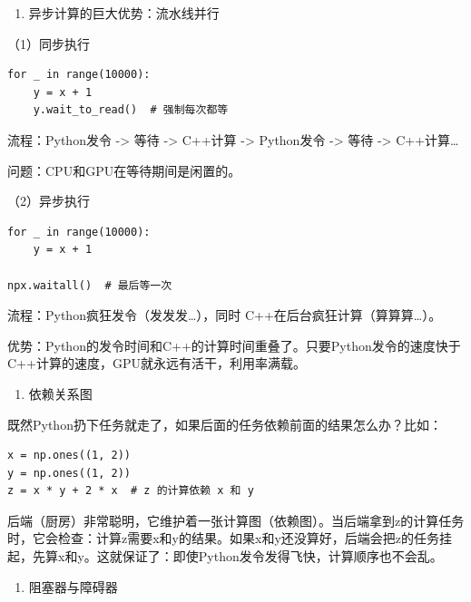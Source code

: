 \begin{enumerate}
\def\labelenumi{\arabic{enumi}.}
\setcounter{enumi}{1}
\tightlist
\item
  异步计算的巨大优势：流水线并行
\end{enumerate}

（1）同步执行

\begin{verbatim}
for _ in range(10000):
    y = x + 1
    y.wait_to_read()  # 强制每次都等
\end{verbatim}

流程：Python发令 -\textgreater{} 等待 -\textgreater{} C++计算 -\textgreater{} Python发令 -\textgreater{} 等待 -\textgreater{} C++计算\ldots{}

问题：CPU和GPU在等待期间是闲置的。

（2）异步执行

\begin{verbatim}
for _ in range(10000):
    y = x + 1

npx.waitall()  # 最后等一次
\end{verbatim}

流程：Python疯狂发令（发发发\ldots），同时 C++在后台疯狂计算（算算算\ldots）。

优势：Python的发令时间和C++的计算时间重叠了。只要Python发令的速度快于C++计算的速度，GPU就永远有活干，利用率满载。

\begin{enumerate}
\def\labelenumi{\arabic{enumi}.}
\setcounter{enumi}{2}
\tightlist
\item
  依赖关系图
\end{enumerate}

既然Python扔下任务就走了，如果后面的任务依赖前面的结果怎么办？比如：

\begin{verbatim}
x = np.ones((1, 2))
y = np.ones((1, 2))
z = x * y + 2 * x  # z 的计算依赖 x 和 y
\end{verbatim}

后端（厨房）非常聪明，它维护着一张计算图（依赖图）。当后端拿到z的计算任务时，它会检查：计算z需要x和y的结果。如果x和y还没算好，后端会把z的任务挂起，先算x和y。这就保证了：即使Python发令发得飞快，计算顺序也不会乱。

\begin{enumerate}
\def\labelenumi{\arabic{enumi}.}
\setcounter{enumi}{3}
\tightlist
\item
  阻塞器与障碍器
\end{enumerate}

